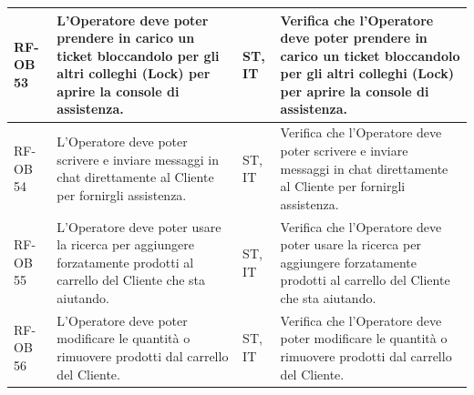 \documentclass[a4paper,11pt,oneside]{scrartcl}
\begin{document}
\begin{longtable}{|p{1.5cm}|p{4.5cm}|p{1.8cm}|p{6cm}|}
    RF-OB 53         & L'Operatore deve poter prendere in carico un ticket bloccandolo per gli altri colleghi (Lock) per aprire la console di assistenza.                                                                                                                                                                    & ST, IT             & Verifica che l'Operatore deve poter prendere in carico un ticket bloccandolo per gli altri colleghi (Lock) per aprire la console di assistenza.                                                                                                                                                                    \\ \hline
    RF-OB 54         & L'Operatore deve poter scrivere e inviare messaggi in chat direttamente al Cliente per fornirgli assistenza.                                                                                                                                                                                          & ST, IT             & Verifica che l'Operatore deve poter scrivere e inviare messaggi in chat direttamente al Cliente per fornirgli assistenza.                                                                                                                                                                                          \\ \hline
    RF-OB 55         & L'Operatore deve poter usare la ricerca per aggiungere forzatamente prodotti al carrello del Cliente che sta aiutando.                                                                                                                                                                                & ST, IT             & Verifica che l'Operatore deve poter usare la ricerca per aggiungere forzatamente prodotti al carrello del Cliente che sta aiutando.                                                                                                                                                                                \\ \hline
    RF-OB 56         & L'Operatore deve poter modificare le quantità o rimuovere prodotti dal carrello del Cliente.                                                                                                                                                                                                          & ST, IT             & Verifica che l'Operatore deve poter modificare le quantità o rimuovere prodotti dal carrello del Cliente.                                                                                                                                                                                                          \\ \hline

\end{longtable}
\end{document}

